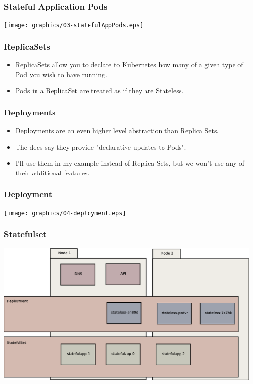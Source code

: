 \documentclass{beamer}
\begin{document}
\begin{frame}
    \frametitle{Stateful Application Pods}
    \texttt{[image: graphics/03-statefulAppPods.eps]}
\end{frame}

\begin{frame}
\frametitle{ReplicaSets}
\begin{itemize}    
    \item ReplicaSets allow you to declare to Kubernetes how many of a given type of Pod you wish to have running.
    \item Pods in a ReplicaSet are treated as if they are Stateless.
\end{itemize}
\end{frame}

\begin{frame}
    \frametitle{Deployments}
    \begin{itemize}
        \item Deployments are an even higher level abstraction than Replica Sets.
        \item The docs say they provide "declarative updates to Pods".
        \item I'll use them in my example instead of Replica Sets, but we won't use any of their additional features.
    \end{itemize}
\end{frame}

\begin{frame}
    \frametitle{Deployment}
    \texttt{[image: graphics/04-deployment.eps]}
\end{frame}

\begin{frame}
    \frametitle{Statefulset}
    \includegraphics[width=\textwidth,height=\textheight,keepaspectratio]{graphics/05-statefulSet.eps}
\end{frame}
\end{document}
